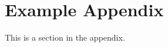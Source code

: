 \documentclass[11pt]{article}
\begin{document}



\appendix

\section{Example Appendix}
\label{sec:appendix}

This is a section in the appendix.
\end{document}
